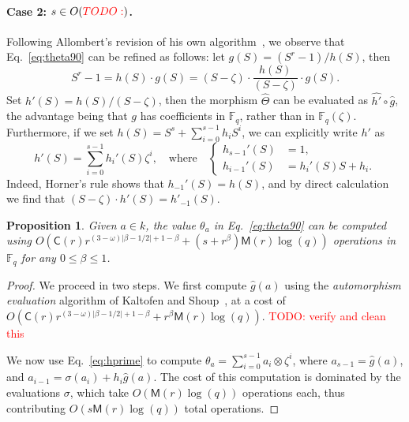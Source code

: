 \documentclass[12pt]{article}
\theoremstyle{plain}
\newtheorem{proposition}[theorem]{Proposition}
\theoremstyle{definition}
\newcommand{\todo}[1]{\textcolor{red}{TODO: #1}}
\def\F{\ensuremath{\mathbb{F}}}
\def\MM{\ensuremath{\mathsf{M}}}
\def\CC{\ensuremath{\mathsf{C}}}
\newcounter{algorithm}
\begin{document}
\paragraph{Case 2: $s\in O(\todo{})$.}
Following Allombert's revision of his own
algorithm~\cite{Allombert02-rev}, we observe that
Eq.~\eqref{eq:theta90} can be refined as follows: let
$g(S)=(S^r-1)/h(S)$, then
\begin{equation}
  S^r-1 = h(S)\cdot g(S) = (S-\zeta)\cdot \frac{h(S)}{(S-\zeta)} \cdot g(S).
\end{equation}
Set $h'(S)=h(S)/(S-\zeta)$, then the morphism $\hat\Theta$ can be evaluated
as $\hat{h'}\circ\hat{g}$, the advantage being that $g$ has
coefficients in $\F_q$, rather than in $\F_q(\zeta)$. %
Furthermore, if we set $h(S)=S^s+\sum_{i=0}^{s-1}h_iS^i$, we can
explicitly write $h'$ as
\begin{equation}
  \label{eq:hprime}
  h'(S)=\sum_{i=0}^{s-1}h_i'(S)\zeta^i,\quad
  \text{where}\quad
  \left\{\begin{aligned}
    h_{s-1}'(S) &= 1,\\
    h_{i-1}'(S) &= h_i'(S) S + h_i.
  \end{aligned}\right.
\end{equation}
Indeed, Horner's rule shows that $h_{-1}'(S)=h(S)$, and by direct
calculation we find that $(S-\zeta)\cdot h'(S) = h'_{-1}(S)$.

\begin{proposition}
  \label{prop:ks-theta}
  Given $a\in k$, the value $\theta_a$ in Eq.~\eqref{eq:theta90} can
  be computed using
  $O(\CC(r)r^{(3-\omega)\lvert\beta-1/2\rvert+1-\beta}+(s+r^\beta)\MM(r)\log(q))$
  operations in $\F_q$ for any $0\le\beta\le1$.
\end{proposition}
\begin{proof}
  We proceed in two steps. We first compute $\hat{g}(a)$ using the
  \emph{automorphism evaluation} algorithm of Kaltofen and
  Shoup~\cite[Algorithm~AE]{kaltofen+shoup98}, at a cost of
  $O(\CC(r)r^{(3-\omega)\lvert\beta-1/2\rvert+1-\beta}+r^\beta\MM(r)\log(q))$.
  \todo{verify and clean this}
  
  We now use Eq.~\eqref{eq:hprime} to compute
  $\theta_a=\sum_{i=0}^{s-1}a_i\otimes\zeta^i$, where
  $a_{s-1}=\hat{g}(a)$, and $a_{i-1}=\sigma(a_i)+h_i\hat{g}(a)$. %
  The cost of this computation is dominated by the evaluations
  $\sigma$, which take $O(\MM(r)\log(q))$ operations each, thus
  contributing $O(s\MM(r)\log(q))$ total operations.
\end{proof}
\end{document}
